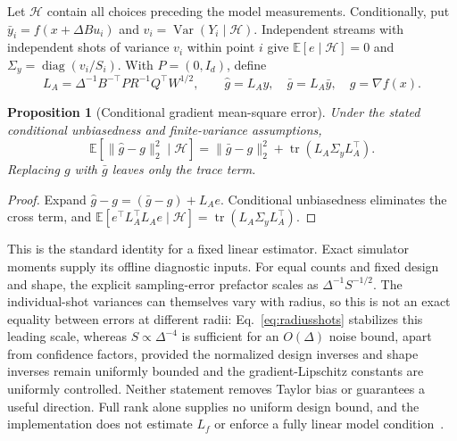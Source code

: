 \documentclass[11pt]{article}
\newcommand{\E}{\mathbb E}
\newcommand{\diag}{\operatorname{diag}}
\newcommand{\tr}{\operatorname{tr}}
\newcommand{\norm}[1]{\lVert #1\rVert}
\newtheorem{proposition}[theorem]{Proposition}
\begin{document}
Let $\mathcal H$ contain all choices preceding the model measurements.
Conditionally, put $\bar y_i=f(x+\Delta Bu_i)$ and
$v_i=\operatorname{Var}(Y_i\mid\mathcal H)$. Independent streams with
independent shots of variance $v_i$ within point $i$ give
$\E[e\mid\mathcal H]=0$ and $\Sigma_y=\diag(v_i/S_i)$.
With $P=(0,I_d)$, define
\begin{equation}
 L_A=\Delta^{-1}B^{-\top}P R^{-1}Q^\top W^{1/2},\qquad
 \widehat g=L_Ay,\quad\bar g=L_A\bar y,\quad g=\nabla f(x).
 \label{eq:gradientmap}
\end{equation}
\begin{proposition}[Conditional gradient mean-square error]
\label{prop:biasvariance}
Under the stated conditional unbiasedness and finite-variance assumptions,
\begin{equation}
 \E[\norm{\widehat g-g}_2^2\mid\mathcal H]
 =\norm{\bar g-g}_2^2+\tr(L_A\Sigma_yL_A^\top).
 \label{eq:biasvariance}
\end{equation}
Replacing $g$ with $\bar g$ leaves only the trace term.
\end{proposition}
\begin{proof}
Expand $\widehat g-g=(\bar g-g)+L_Ae$. Conditional unbiasedness eliminates
the cross term, and
$\E[e^\top L_A^\top L_Ae\mid\mathcal H]=\tr(L_A\Sigma_yL_A^\top)$.
\end{proof}
This is the standard identity for a fixed linear estimator. Exact simulator
moments supply its offline diagnostic inputs. For equal counts and fixed
design and shape, the explicit sampling-error prefactor scales as
$\Delta^{-1}S^{-1/2}$. The individual-shot variances can themselves
vary with radius, so this is not an exact equality between errors at
different radii: Eq.~\eqref{eq:radiusshots} stabilizes this leading
scale, whereas $S\propto\Delta^{-4}$ is sufficient for an $O(\Delta)$
noise bound, apart from confidence factors, provided the normalized
design inverses and shape inverses remain uniformly bounded and the
gradient-Lipschitz constants are uniformly controlled. Neither statement removes
Taylor bias or guarantees a useful direction. Full rank alone supplies no
uniform design bound, and the implementation does not estimate $L_f$ or
enforce a fully linear model condition~\cite{conn2008,chen2018,shashaani2018}.
\end{document}
